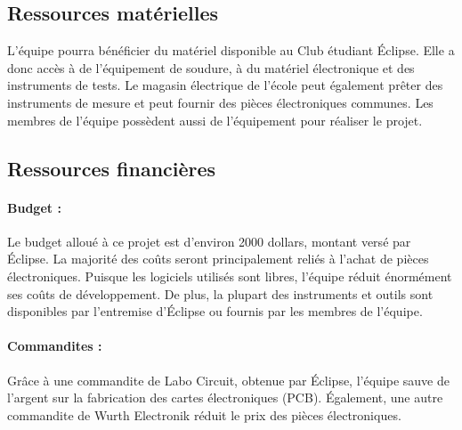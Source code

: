 	
	\subsection{Ressources matérielles}
	L'équipe pourra bénéficier du matériel disponible au Club étudiant Éclipse. Elle a donc accès à de l'équipement de soudure, à du matériel électronique et des instruments de tests. Le magasin électrique de l'école peut également prêter des instruments de mesure et peut fournir des pièces électroniques communes. Les membres de l'équipe possèdent aussi de l'équipement pour réaliser le projet.
	
	\subsection{Ressources financières}
	
		\paragraph{Budget :}
		Le budget alloué à ce projet est d'environ 2000 dollars, montant versé par Éclipse. La majorité des coûts seront principalement reliés à l'achat de pièces électroniques. Puisque les logiciels utilisés sont libres, l'équipe réduit énormément ses coûts de développement. De plus, la plupart des instruments et outils sont disponibles par l'entremise d'Éclipse ou fournis par les membres de l'équipe.
		
		\paragraph{Commandites :}
		Grâce à une commandite de Labo Circuit, obtenue par Éclipse, l'équipe sauve de l'argent sur la fabrication des cartes électroniques (PCB). Également, une autre commandite de Wurth Electronik réduit le prix des pièces électroniques.
